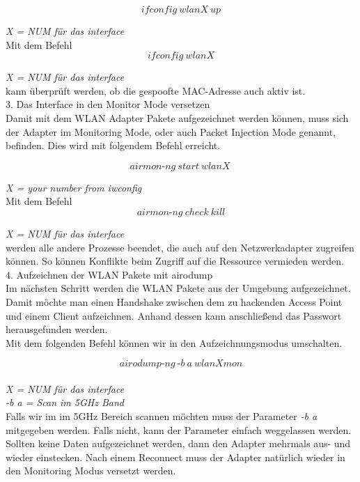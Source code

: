 $$ifconfig~wlanX~up$$

\textit{X = NUM für das interface}\\


Mit dem Befehl\\ 
$$ifconfig~wlanX$$

\textit{X = NUM für das interface}\\

kann überprüft werden, ob die gespoofte MAC-Adresse auch aktiv ist.\\

{\Large 3. Das Interface in den Monitor Mode versetzen}\\

Damit mit dem WLAN Adapter Pakete aufgezeichnet werden können, muss sich der Adapter im Monitoring Mode, oder auch Packet Injection Mode genannt, befinden. Dies wird mit folgendem Befehl erreicht.

$$airmon\text{-}ng~start~wlanX~$$

\textit{X = your number from iwconfig}\\

Mit dem Befehl\\ 

$$airmon\text{-}ng~check~kill$$

\textit{X = NUM für das interface}\\


werden alle andere Prozesse beendet, die auch auf den Netzwerkadapter zugreifen können. So können Konflikte beim Zugriff auf die Ressource vermieden werden.\\

{\Large 4. Aufzeichnen der WLAN Pakete mit airodump}\\
	
Im nächsten Schritt werden die WLAN Pakete aus der Umgebung aufgezeichnet. Damit möchte man einen Handshake zwischen dem zu hackenden Access Point und einem Client aufzeichnen. Anhand dessen kann anschließend das Passwort herausgefunden werden.\\

Mit dem folgenden Befehl können wir in den Aufzeichnungsmodus umschalten.
	
	$$airodump\text{-}ng~\text{-}b~a~wlanXmon$$\\
	 
	\textit{X = NUM für das interface}\\
	\textit{-b a = Scan im 5GHz Band}\\	
	
Falls wir im im 5GHz Bereich scannen möchten muss der Parameter \textit{-b a} mitgegeben werden. Falls nicht, kann der Parameter einfach weggelassen werden.\\	
Sollten keine Daten aufgezeichnet werden, dann den Adapter mehrmals aus- und wieder einstecken. 
Nach einem Reconnect muss der Adapter natürlich wieder in den Monitoring Modus versetzt werden.
	
